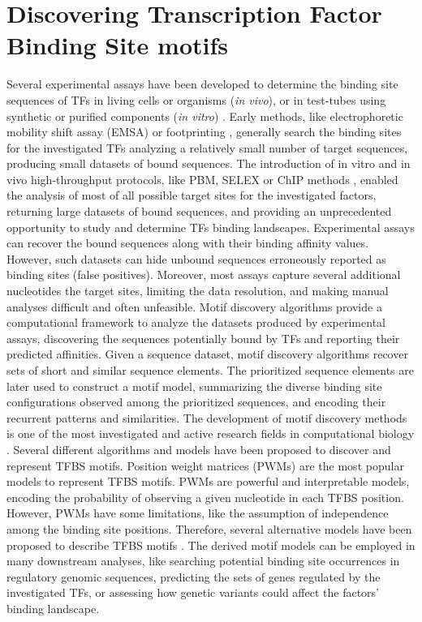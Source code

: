\documentclass[a4paper, titlepage, openright]{book}
\begin{document}
\section{Discovering Transcription Factor Binding Site motifs}
Several experimental assays have been developed to determine the binding site sequences of TFs in living cells or organisms (\emph{in vivo}), or in test-tubes using synthetic or purified components (\emph{in vitro}) \citep{jolma2011methods}. Early methods, like electrophoretic mobility shift assay (EMSA) \citep{garner1981gel} or footprinting \citep{hampshire2007footprinting}, generally search the binding sites for the investigated TFs analyzing a relatively small number of target sequences, producing small datasets of bound sequences. The introduction of in vitro and in vivo high-throughput protocols, like PBM, SELEX or ChIP methods \citep{berger2006compact,jolma2010multiplexed,collas2008chop}, enabled the analysis of most of all possible target sites for the investigated factors, returning large datasets of bound sequences, and providing an unprecedented opportunity to study and determine TFs binding landscapes. Experimental assays can recover the bound sequences along with their binding affinity values. However, such datasets can hide unbound sequences erroneously reported as binding sites (false positives). Moreover, most assays capture several additional nucleotides the target sites, limiting the data resolution, and making manual analyses difficult and often unfeasible. Motif discovery algorithms provide a computational framework to analyze the datasets produced by experimental assays, discovering the sequences potentially bound by TFs and reporting their predicted affinities. Given a sequence dataset, motif discovery algorithms recover sets of short and similar sequence elements. The prioritized sequence elements are later used to construct a motif model, summarizing the diverse binding site configurations observed among the prioritized sequences, and encoding their recurrent patterns and similarities. The development of motif discovery methods is one of the most investigated and active research fields in computational biology \citep{pavesi2004silico,tompa2005assessing,d2006does,das2007survey,zambelli2013motif}. Several different algorithms and models have been proposed to discover and represent TFBS motifs. Position weight matrices (PWMs) \citep{stormo2000dna} are the most popular models to represent TFBS motifs. PWMs are powerful and interpretable models, encoding the probability of observing a given nucleotide in each TFBS position. However, PWMs have some limitations, like the assumption of independence among the binding site positions. Therefore, several alternative models have been proposed to describe TFBS motifs \citep{siddharthan2010dinucleotide,gorkin2012integration,he2021survey}. The derived motif models can be employed in many downstream analyses, like searching potential binding site occurrences in regulatory genomic sequences, predicting the sets of genes regulated by the investigated TFs, or assessing how genetic variants could affect the factors’ binding landscape.
\end{document}
